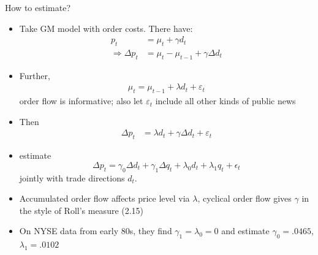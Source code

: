 \documentclass[english,10pt
,aspectratio=169
]{beamer}
\begin{document}
\begin{frame}{How to estimate?}
	\begin{itemize}
		\item Take GM model with order costs. There have:
		\begin{align*}
			p_t &= \mu_t + \gamma d_t
			\\
			\Rightarrow \varDelta p_t &= \mu_t - \mu_{t-1} + \gamma \varDelta d_t
		\end{align*}
		\item Further,
		\begin{align*}
			\mu_t = \mu_{t-1} + \lambda d_t + \varepsilon_t
		\end{align*}
		order flow is informative; also let $\varepsilon_t$ include all other kinds of public news
		\item Then
		\begin{align*}
			\varDelta p_t &= \lambda d_t + \gamma \varDelta d_t + \varepsilon_t
		\end{align*}
	\end{itemize}
\end{frame}


\begin{frame}{\cite{glosten_estimating_1988}}
	\begin{itemize}
		\item \textbf{\cite{glosten_estimating_1988}} estimate
		\begin{equation} \tag{5.7}
			\Delta p_t = \gamma_0 \Delta d_t+ \gamma_1 \Delta q_t + \lambda_0 d_t + \lambda_1 q_t + \epsilon_t
		\end{equation}
		jointly with trade directions $d_t$. 
		\item Accumulated order flow affects price level via $\lambda$, cyclical order flow gives $\gamma$ in the style of Roll's measure (2.15)
		\item On NYSE data from early 80s, they find $\gamma_1=\lambda_0=0$ and estimate $\gamma_0=.0465$, $\lambda_1=.0102$
	\end{itemize}
\end{frame}
\end{document}
